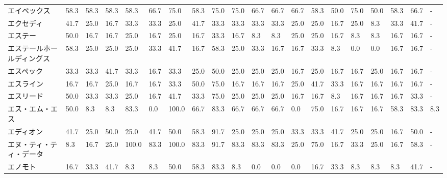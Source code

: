 \documentclass[a4paper，11pt]{jsarticle}
\begin{document}
\begin{longtable}[c]{lp{3mm}p{3mm}p{3mm}p{3mm}p{3mm}p{3mm}p{3mm}p{3mm}p{3mm}p{3mm}p{3mm}p{3mm}p{3mm}p{3mm}p{3mm}p{3mm}p{3mm}p{3mm}p{3mm}}
エイベックス          &   58.3 &   58.3 &      58.3 &      58.3 &       66.7 &   75.0 &   58.3 &   75.0 &    75.0 &    66.7 &   66.7 &  66.7 &   58.3 &    50.0 &    75.0 &  50.0 &  58.3 &  66.7 &     - \\
エクセディ           &   41.7 &   25.0 &      16.7 &      33.3 &       33.3 &   25.0 &   41.7 &   33.3 &    33.3 &    33.3 &   33.3 &  25.0 &   25.0 &    16.7 &    25.0 &   8.3 &  33.3 &  41.7 &     - \\
エステー            &   50.0 &   16.7 &      16.7 &      25.0 &       16.7 &   25.0 &   16.7 &   33.3 &    16.7 &     8.3 &    8.3 &  25.0 &   25.0 &    16.7 &     8.3 &   8.3 &  16.7 &  16.7 &     - \\
エステールホールディングス   &   58.3 &   25.0 &      25.0 &      25.0 &       33.3 &   41.7 &   16.7 &   58.3 &    25.0 &    33.3 &   16.7 &  16.7 &   33.3 &     8.3 &     0.0 &   0.0 &  16.7 &  16.7 &     - \\
エスペック           &   33.3 &   33.3 &      41.7 &      33.3 &       16.7 &   33.3 &   25.0 &   50.0 &    25.0 &    25.0 &   25.0 &  16.7 &   25.0 &    16.7 &    16.7 &  25.0 &  16.7 &  16.7 &     - \\
エスライン           &   16.7 &   16.7 &      25.0 &      16.7 &       16.7 &   33.3 &   50.0 &   75.0 &    16.7 &    16.7 &   16.7 &  25.0 &   41.7 &    33.3 &    16.7 &  16.7 &  16.7 &  16.7 &     - \\
エスリード           &   50.0 &   33.3 &      33.3 &      25.0 &       16.7 &   41.7 &   33.3 &   75.0 &    25.0 &    25.0 &   25.0 &  16.7 &   16.7 &     8.3 &    16.7 &  16.7 &  16.7 &  33.3 &     - \\
エス・エム・エス        &   50.0 &    8.3 &       8.3 &      83.3 &        0.0 &  100.0 &   66.7 &   83.3 &    66.7 &    66.7 &   66.7 &   0.0 &   75.0 &    16.7 &    16.7 &  16.7 &  58.3 &  83.3 &   8.3 \\
エディオン           &   41.7 &   25.0 &      50.0 &      25.0 &       41.7 &   50.0 &   58.3 &   91.7 &    25.0 &    25.0 &   25.0 &  33.3 &   33.3 &    41.7 &    25.0 &  25.0 &  16.7 &  50.0 &     - \\
エヌ・ティ・ティ・データ    &    8.3 &   16.7 &      25.0 &     100.0 &       83.3 &  100.0 &   83.3 &   91.7 &    83.3 &    83.3 &   83.3 &  25.0 &   75.0 &    16.7 &    33.3 &  25.0 &  16.7 &  58.3 &     - \\
エノモト            &   16.7 &   33.3 &      41.7 &       8.3 &        8.3 &   50.0 &   58.3 &   83.3 &     8.3 &     0.0 &    0.0 &   0.0 &   16.7 &    33.3 &     8.3 &   8.3 &   8.3 &  41.7 &     - \\

\end{longtable}
\end{document}
